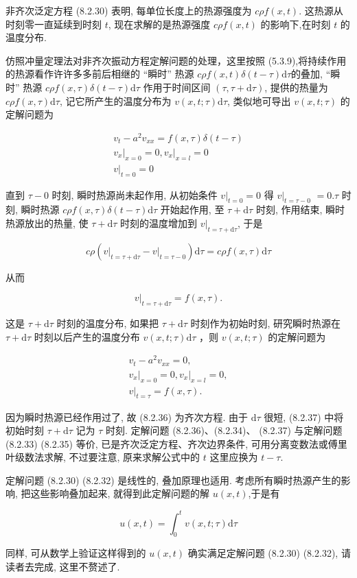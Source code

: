 非齐次泛定方程 (8.2.30) 表明, 每单位长度上的热源强度为 $c \rho f(x, t)$. 这热源从时刻零一直延续到时刻 $t$, 现在求解的是热源强度 $c \rho f(x, t)$ 的影响下,在时刻 $t$ 的温度分布.

仿照冲量定理法对非齐次振动方程定解问题的处理，这里按照 (5.3.9),将持续作用的热源看作许许多多前后相继的 “瞬时” 热源 $c \rho f(x, t) \delta(t-\tau) \mathrm{d} \tau$的叠加, “瞬时” 热源 $c \rho f(x, \tau) \delta(t-\tau) \mathrm{d} \tau$ 作用于时间区间 $(\tau, \tau+\mathrm{d} \tau)$, 提供的热量为 $c \rho f(x, \tau) \mathrm{d} \tau$, 记它所产生的温度分布为 $v(x, t ; \tau) \mathrm{d} \tau$, 类似地可导出 $v(x, t ; \tau)$ 的定解问题为

$$
\begin{gathered}
v_{t}-a^{2} v_{x x}=f(x, \tau) \delta(t-\tau) \\
\left.v_{x}\right|_{x=0}=0,\left.v_{x}\right|_{x=l}=0 \\
\left.v\right|_{t=0}=0
\end{gathered}
$$

直到 $\tau-0$ 时刻, 瞬时热源尚未起作用, 从初始条件 $\left.v\right|_{t=0}=0$ 得 $\left.v\right|_{t=\tau-0}$
$=0 . \tau$ 时刻, 瞬时热源 $c \rho f(x, \tau) \delta(t-\tau) \mathrm{d} \tau$ 开始起作用, 至 $\tau+\mathrm{d} \tau$ 时刻, 作用结束, 瞬时热源放出的热量, 使 $\tau+\mathrm{d} \tau$ 时刻的温度增加到 $\left.v\right|_{t=\tau+\mathrm{d} \tau}$, 于是

$$
c \rho\left(\left.v\right|_{t=\tau+\mathrm{d} \tau}-\left.v\right|_{t=\tau-0}\right) \mathrm{d} \tau=c \rho f(x, \tau) \mathrm{d} \tau
$$

从而

$$
\left.v\right|_{t=\tau+\mathrm{d} \tau}=f(x, \tau) .
$$

这是 $\tau+\mathrm{d} \tau$ 时刻的温度分布, 如果把 $\tau+\mathrm{d} \tau$ 时刻作为初始时刻, 研究瞬时热源在 $\tau+\mathrm{d} \tau$ 时刻以后产生的温度分布 $v(x, t ; \tau) \mathrm{d} \tau$ ，则 $v(x, t ; \tau)$ 的定解问题为

$$
\begin{gathered}
v_{t}-a^{2} v_{x x}=0, \\
\left.v_{x}\right|_{x=0}=0,\left.v_{x}\right|_{x=l}=0, \\
\left.v\right|_{t=\tau}=f(x, \tau) .
\end{gathered}
$$

因为瞬时热源已经作用过了, 故 (8.2.36) 为齐次方程. 由于 $\mathrm{d} \tau$ 很短, (8.2.37) 中将初始时刻 $\tau+\mathrm{d} \tau$ 记为 $\tau$ 时刻. 定解问题 (8.2.36)、(8.2.34)、 (8.2.37) 与定解问题 (8.2.33) (8.2.35) 等价, 已是齐次泛定方程、齐次边界条件, 可用分离变数法或傅里叶级数法求解, 不过要注意, 原来求解公式中的 $t$ 这里应换为 $t-\tau$.

定解问题 (8.2.30) (8.2.32) 是线性的, 叠加原理也适用. 考虑所有瞬时热源产生的影响, 把这些影响叠加起来, 就得到此定解问题的解 $u(x, t)$,于是有

$$
u(x, t)=\int_{0}^{t} v(x, t ; \tau) \mathrm{d} \tau
$$

同样, 可从数学上验证这样得到的 $u(x, t)$ 确实满足定解问题 (8.2.30) (8.2.32), 请读者去完成, 这里不赘述了.